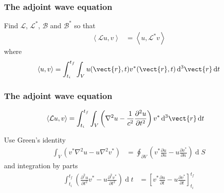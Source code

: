 \documentclass[12 pt, compress, handout, intlimits]{beamer}
\renewcommand{\d}{\operatorname{d}\!}
\renewcommand{\L}{\mathcal{L}}
\renewcommand{\B}{\mathcal{B}}
\newcommand{\inprod}[2]{\left\langle {#1}, {#2} \right\rangle}
\renewcommand{\L}{\mathcal{L}}
\begin{document}
\begin{frame}[fragile]
    \frametitle{The adjoint wave equation}

    Find $ \L $, $ \L^* $, $ \B $ and $ \B^* $ so that
    \begin{align*}
        \inprod{\L u}{v} &= \inprod{u}{\L^* v}
    \end{align*}
    where
    \begin{align*}
        \inprod{u}{v} = \int_{t_i}^{t_f} \int_V u(\vect{r}, t) v^*(\vect{r}, t) \d^3 \vect{r} \d t
    \end{align*}
    
\end{frame}


\begin{frame}[fragile]
    \frametitle{The adjoint wave equation}

    \vspace{-24pt}
    \begin{align*}
        \inprod{\L u}{v} &= \int_{t_i}^{t_f} \int_V \left( \nabla^2 u - \frac{1}{c^2} \frac{\partial^2 u}{\partial t^2} \right) v^* \d^3 \vect{r} \d t
    \end{align*}
    
    Use Green's identity
    \begin{align*}
        \int_V \left( v^* \nabla^2 u - u \nabla^2 v^* \right) &= \oint_{\partial V} \left( v^* \frac{\partial u}{\partial n} - u \frac{\partial v^*}{\partial n} \right) \d S
    \end{align*}
    and integration by parts
    \begin{align*}
        \int_{t_i}^{t_f} \left( \frac{\partial^2 u}{\partial t^2} v^* - u \frac{\partial^2 v^*}{\partial t^2} \right) \d t &= \left[ v^* \frac{\partial u}{\partial t} - u \frac{\partial v^*}{\partial t} \right]_{t_i}^{t_f}
    \end{align*}
\end{frame}
\end{document}
